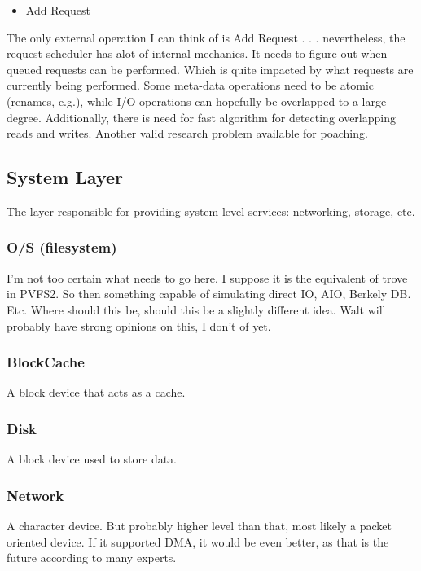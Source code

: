 \documentclass[11pt]{article}
\begin{document}
\begin{itemize}
\item Add Request
\end{itemize}

The only external operation I can think of is Add Request . . . nevertheless,
the request scheduler has alot of internal mechanics.  It needs to figure out
when queued requests can be performed.  Which is quite impacted by what
requests are currently being performed.  Some meta-data operations need to be
atomic (renames, e.g.), while I/O operations can hopefully be overlapped to a
large degree.  Additionally, there is need for fast algorithm for detecting
overlapping reads and writes.  Another valid research problem available for
poaching.

\subsection{System Layer}
The layer responsible for providing system level services: networking,
storage, etc.

\subsubsection{O/S (filesystem)}
I'm not too certain what needs to go here.  I suppose it is the equivalent of
trove in PVFS2.  So then something capable of simulating direct IO, AIO,
Berkely DB.  Etc.  Where should this be, should this be a slightly different
idea.  Walt will probably have strong opinions on this, I don't of yet.

\subsubsection{BlockCache}
A block device that acts as a cache.

\subsubsection{Disk}
A block device used to store data.

\subsubsection{Network}
A character device.  But probably higher level than that, most likely a packet
oriented device.  If it supported  DMA, it would be even better, as that is
the future according to many experts.
\end{document}
